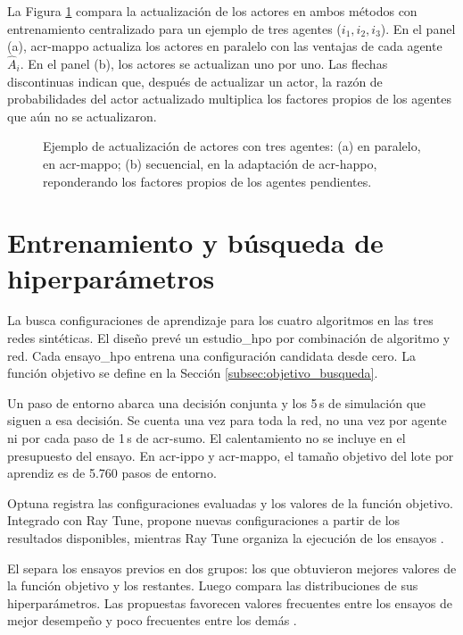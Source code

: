 La Figura \ref{fig:informacion_controladores} compara la actualización de los actores en ambos métodos con entrenamiento centralizado para un ejemplo de tres agentes ($i_1, i_2, i_3$). En el panel (a), \acrshort{acr-mappo} actualiza los actores en paralelo con las ventajas de cada agente $\hat{A}_i$. En el panel (b), los actores se actualizan uno por uno. Las flechas discontinuas indican que, después de actualizar un actor, la razón de probabilidades del actor actualizado multiplica los factores propios de los agentes que aún no se actualizaron.

\begin{figure}[H]\centering

\caption{Ejemplo de actualización de actores con tres agentes: (a) en paralelo, en \acrshort{acr-mappo}; (b) secuencial, en la adaptación de \acrshort{acr-happo}, reponderando los factores propios de los agentes pendientes.}
\label{fig:informacion_controladores}
\end{figure}

\section{Entrenamiento y búsqueda de hiperparámetros}
\label{sec:experimentos_hiperparametros}

La  busca configuraciones de aprendizaje para los cuatro algoritmos en las tres redes sintéticas. El diseño prevé un \gls{estudio_hpo} por combinación de algoritmo y red. Cada \gls{ensayo_hpo} entrena una configuración candidata desde cero. La función objetivo se define en la Sección \ref{subsec:objetivo_busqueda}.

Un paso de entorno abarca una decisión conjunta y los 5\,s de simulación que siguen a esa decisión. Se cuenta una vez para toda la red, no una vez por agente ni por cada paso de 1\,s de \acrshort{acr-sumo}. El calentamiento no se incluye en el presupuesto del ensayo. En \acrshort{acr-ippo} y \acrshort{acr-mappo}, el tamaño objetivo del lote por aprendiz es de 5.760 pasos de entorno.

Optuna registra las configuraciones evaluadas y los valores de la función objetivo. Integrado con Ray Tune, propone nuevas configuraciones a partir de los resultados disponibles, mientras Ray Tune organiza la ejecución de los ensayos \cite{akiba2019optuna,liaw2018tune}.

El  separa los ensayos previos en dos grupos: los que obtuvieron mejores valores de la función objetivo y los restantes. Luego compara las distribuciones de sus hiperparámetros. Las propuestas favorecen valores frecuentes entre los ensayos de mejor desempeño y poco frecuentes entre los demás \cite{Bergstra2011TPE}.

